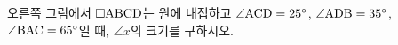\noindent\begin{minipage}[t]{0.58\linewidth}\vspace{0pt}\raggedright 오른쪽 그림에서 $\square\mathrm{ABCD}$는 원에 내접하고 $\angle\mathrm{ACD}=25^\circ$, $\angle\mathrm{ADB}=35^\circ$, $\angle\mathrm{BAC}=65^\circ$일 때, $\angle x$의 크기를 구하시오.\end{minipage}\hfill\begin{minipage}[t]{0.4\linewidth}\vspace{0pt}\centering \resizebox{\ifdim\width>\linewidth\linewidth\else\width\fi}{!}{}\end{minipage}\par
